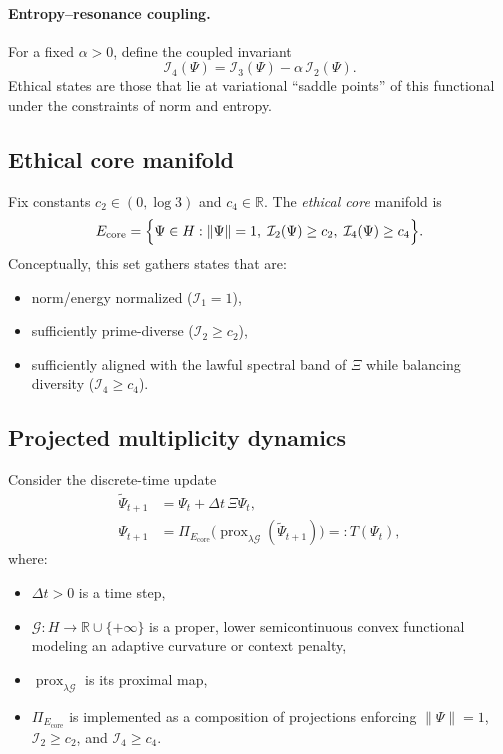 \documentclass[11pt]{article}
\begin{document}
\paragraph{Entropy--resonance coupling.}
For a fixed $\alpha>0$, define the coupled invariant
\[
  \mathcal{I}_4(\Psi) = \mathcal{I}_3(\Psi) - \alpha\,\mathcal{I}_2(\Psi).
\]
Ethical states are those that lie at variational ``saddle points'' of this functional
under the constraints of norm and entropy.

\subsection{Ethical core manifold}

Fix constants $c_2\in(0,\log 3)$ and $c_4\in\mathbb{R}$. The \emph{ethical core} manifold is
\begin{equation}
  E_{\mathrm{core}}
  =
  \Bigl\{
    \Psi\in H :
    \|\Psi\|=1,\;
    \mathcal{I}_2(\Psi) \ge c_2,\;
    \mathcal{I}_4(\Psi) \ge c_4
  \Bigr\}.
  \label{eq:Ecore-Xi}
\end{equation}
Conceptually, this set gathers states that are:
\begin{itemize}[leftmargin=*]
  \item norm/energy normalized ($\mathcal{I}_1=1$),
  \item sufficiently prime-diverse ($\mathcal{I}_2\ge c_2$),
  \item sufficiently aligned with the lawful spectral band of $\Xi$ while balancing diversity
        ($\mathcal{I}_4\ge c_4$).
\end{itemize}

\subsection{Projected multiplicity dynamics}

Consider the discrete-time update
\begin{align}
  \tilde{\Psi}_{t+1} &= \Psi_t + \Delta t\,\Xi\Psi_t, \label{eq:raw-step-Xi}\\
  \Psi_{t+1} &= \Pi_{E_{\mathrm{core}}}
  \bigl(
     \operatorname{prox}_{\lambda\mathcal{G}}(\tilde{\Psi}_{t+1})
  \bigr)
  =: T(\Psi_t),
  \label{eq:projected-step-Xi}
\end{align}
where:
\begin{itemize}[leftmargin=*]
  \item $\Delta t>0$ is a time step,
  \item $\mathcal{G}:H\to\mathbb{R}\cup\{+\infty\}$ is a proper, lower semicontinuous convex functional
        modeling an adaptive curvature or context penalty,
  \item $\operatorname{prox}_{\lambda\mathcal{G}}$ is its proximal map,
  \item $\Pi_{E_{\mathrm{core}}}$ is implemented as a composition of projections enforcing
        $\|\Psi\|=1$, $\mathcal{I}_2\ge c_2$, and $\mathcal{I}_4\ge c_4$.
\end{itemize}
\end{document}
